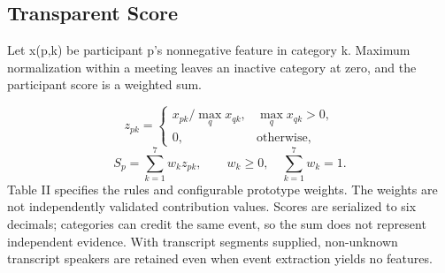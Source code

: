 \documentclass[journal]{IEEEtran}
\begin{document}
\subsection{Transparent Score}
Let x(p,k) be participant p's nonnegative feature in category k. Maximum normalization within a meeting leaves an inactive category at zero, and the participant score is a weighted sum.

\begin{equation}
z_{pk}=\begin{cases}x_{pk}/\max_q x_{qk},&\max_q x_{qk}>0,\\0,&\text{otherwise},\end{cases}
\label{eq:1}
\end{equation}
\begin{equation}
S_p=\sum_{k=1}^{7}w_kz_{pk},\qquad w_k\geq0,\quad\sum_{k=1}^{7}w_k=1.
\label{eq:2}
\end{equation}
Table II specifies the rules and configurable prototype weights. The weights are not independently validated contribution values. Scores are serialized to six decimals; categories can credit the same event, so the sum does not represent independent evidence. With transcript segments supplied, non-unknown transcript speakers are retained even when event extraction yields no features.
\end{document}
